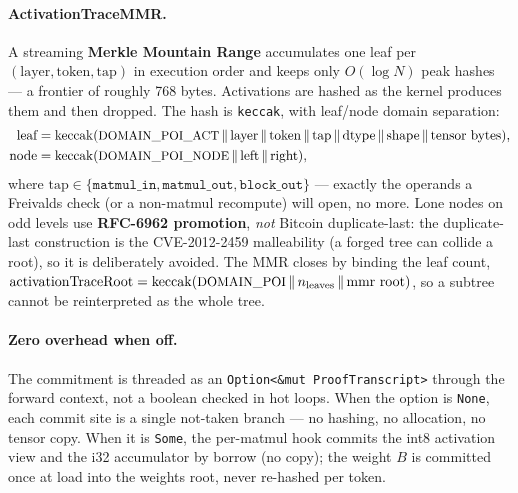 \documentclass[11pt]{article}
\newcommand{\keccak}{\ensuremath{\mathrm{keccak}}}
\newcommand{\code}[1]{\texttt{#1}}
\begin{document}
\paragraph{ActivationTraceMMR.} A streaming \textbf{Merkle Mountain Range}
accumulates one leaf per $(\text{layer}, \text{token}, \text{tap})$ in execution
order and keeps only $O(\log N)$ peak hashes --- a frontier of roughly 768 bytes.
Activations are hashed as the kernel produces them and then dropped. The hash is
\code{keccak}, with leaf/node domain separation:
\begin{align*}
\text{leaf} &= \keccak(\text{\small DOMAIN\_POI\_ACT} \,\|\, \text{layer}
   \,\|\, \text{token} \,\|\, \text{tap} \,\|\, \text{dtype} \,\|\,
   \text{shape} \,\|\, \text{tensor bytes}),\\
\text{node} &= \keccak(\text{\small DOMAIN\_POI\_NODE} \,\|\, \text{left}
   \,\|\, \text{right}),
\end{align*}
where $\text{tap} \in \{\code{matmul\_in}, \code{matmul\_out},
\code{block\_out}\}$ --- exactly the operands a Freivalds check (or a non-matmul
recompute) will open, no more. Lone nodes on odd levels use \textbf{RFC-6962
promotion}, \emph{not} Bitcoin duplicate-last: the duplicate-last construction is
the CVE-2012-2459 malleability (a forged tree can collide a root), so it is
deliberately avoided. The MMR closes by binding the leaf count,
$\text{activationTraceRoot} = \keccak(\text{\small DOMAIN\_POI} \,\|\,
n_{\text{leaves}} \,\|\, \text{mmr root})$, so a subtree cannot be reinterpreted
as the whole tree.

\paragraph{Zero overhead when off.} The commitment is threaded as an
\code{Option<\&mut ProofTranscript>} through the forward context, not a boolean
checked in hot loops. When the option is \code{None}, each commit site is a
single not-taken branch --- no hashing, no allocation, no tensor copy. When it is
\code{Some}, the per-matmul hook commits the int8 activation view and the i32
accumulator by borrow (no copy); the weight $B$ is committed once at load into
the weights root, never re-hashed per token.
\end{document}
